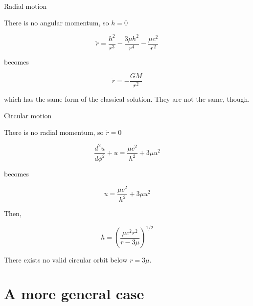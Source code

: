\documentclass[xcolor=dvipsnames]{beamer}
\begin{document}
\begin{frame}{Radial motion}
    
There is no angular momentum, so $h=0$

\begin{equation*}
     \ddot{r} = \frac{h^2}{r^3} - \frac{3\mu h^2}{r^4} - \frac{\mu c^2}{r^2}
\end{equation*}
    
becomes 

\begin{block}{}
\begin{equation*}
     \ddot{r} = - \frac{GM}{r^2}
\end{equation*}
\end{block}

which has the same form of the classical solution. They are not the same, though.

\end{frame}



\begin{frame}{Circular motion}
    
There is no radial momentum, so $\dot{r}=0$

\begin{equation*}
    \frac{d^2 u}{d\phi^2} + u = \frac{\mu c^2}{h^2} + 3 \mu u^2
\end{equation*}
    
becomes 

\begin{equation*}
     u = \frac{\mu c^2}{h^2} + 3 \mu u^2
\end{equation*}

Then,

\begin{block}{}
\begin{equation*}
 h = \left( \frac{\mu c^2 r^2}{r - 3\mu} \right)^{1/2}
\end{equation*}
\end{block}

There exists no valid circular orbit below $r = 3\mu$. 

\end{frame}


\section{A more general case}
\end{document}
